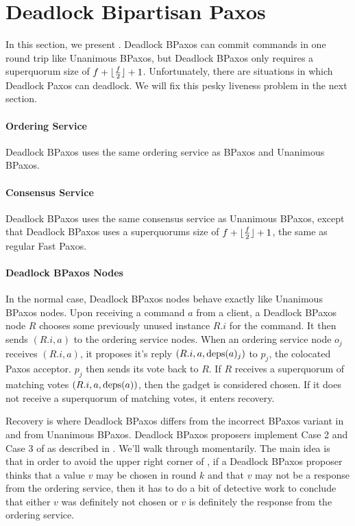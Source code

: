 \section{Deadlock Bipartisan Paxos}
In this section, we present . Deadlock
BPaxos can commit commands in one round trip like Unanimous BPaxos, but
Deadlock BPaxos only requires a superquorum size of $f + \lfloor\frac{f}{2}\rfloor +
1$. Unfortunately, there are situations in which Deadlock Paxos can deadlock.
We will fix this pesky liveness problem in the next section.

\paragraph{Ordering Service}
Deadlock BPaxos uses the same ordering service as BPaxos and Unanimous BPaxos.

\paragraph{Consensus Service}
Deadlock BPaxos uses the same consensus service as Unanimous BPaxos, except
that Deadlock BPaxos uses a superquorums size of $f + \lfloor\frac{f}{2}\rfloor + 1$,
the same as regular Fast Paxos.

\paragraph{Deadlock BPaxos Nodes}
In the normal case, Deadlock BPaxos nodes behave exactly like Unanimous BPaxos
nodes. Upon receiving a command $a$ from a client, a Deadlock BPaxos node $R$
chooses some previously unused instance $R.i$ for the command. It then sends
$(R.i, a)$ to the ordering service nodes.
%
When an ordering service node $o_j$ receives $(R.i, a)$, it proposes it's reply
$(R.i, a, \text{deps}(a)_j)$ to $p_j$, the colocated Paxos acceptor. $p_j$ then sends
its vote back to $R$.
%
If $R$ receives a superquorum of matching votes $(R.i, a, \text{deps}(a))$, then the
gadget is considered chosen. If it does not receive a superquorum of matching
votes, it enters recovery.

Recovery is where Deadlock BPaxos differs from the incorrect BPaxos variant in
 and from Unanimous BPaxos. Deadlock BPaxos proposers
implement Case 2 and Case 3 of  as described in
. We'll walk through 
momentarily. The main idea is that in order to avoid the upper right corner of
, if a Deadlock BPaxos proposer thinks that a value $v$ may
be chosen in round $k$ and that $v$ may not be a response from the ordering
service, then it has to do a bit of detective work to conclude that either $v$
was definitely not chosen or $v$ is definitely the response from the ordering
service.

